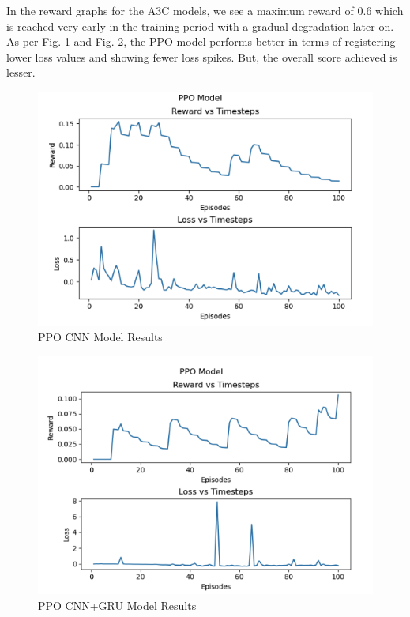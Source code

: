 \documentclass[conference]{IEEEtran}
\begin{document}
In the reward graphs for the A3C models, we see a maximum reward of 0.6 which is reached very early in the training period with a gradual degradation later on. As per Fig. \ref{ppo_cnn_result} and Fig. \ref{ppo_gru_result}, the PPO model performs better in terms of registering lower loss values and showing fewer loss spikes. But, the overall score achieved is lesser.

\begin{figure}[h!]
    \centering
    \includegraphics[width=\linewidth]{ppo_cnn_results.png}
    \caption{PPO CNN Model Results}
    \label{ppo_cnn_result}
\end{figure}

\begin{figure}[h!]
    \centering
    \includegraphics[width=\linewidth]{ppo_gru_results.png}
    \caption{PPO CNN+GRU Model Results}
    \label{ppo_gru_result}
\end{figure}
\end{document}
